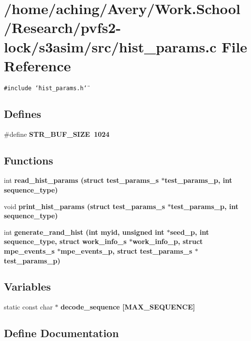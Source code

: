 \section{/home/aching/Avery/Work.School/Research/pvfs2-lock/s3asim/src/hist\_\-params.c File Reference}
\label{hist__params_8c}
{\tt \#include \char`\"{}hist\_\-params.h\char`\"{}}\par
\subsection*{Defines}
\begin{CompactItemize}
\item 
\#define \bf{STR\_\-BUF\_\-SIZE}~1024
\end{CompactItemize}
\subsection*{Functions}
\begin{CompactItemize}
\item 
int \bf{read\_\-hist\_\-params} (struct \bf{test\_\-params\_\-s} $\ast$test\_\-params\_\-p, int sequence\_\-type)
\item 
void \bf{print\_\-hist\_\-params} (struct \bf{test\_\-params\_\-s} $\ast$test\_\-params\_\-p, int sequence\_\-type)
\item 
int \bf{generate\_\-rand\_\-hist} (int myid, unsigned int $\ast$seed\_\-p, int sequence\_\-type, struct \bf{work\_\-info\_\-s} $\ast$work\_\-info\_\-p, struct \bf{mpe\_\-events\_\-s} $\ast$mpe\_\-events\_\-p, struct \bf{test\_\-params\_\-s} $\ast$test\_\-params\_\-p)
\end{CompactItemize}
\subsection*{Variables}
\begin{CompactItemize}
\item 
static const char $\ast$ \bf{decode\_\-sequence} [MAX\_\-SEQUENCE]
\end{CompactItemize}


\subsection{Define Documentation}
